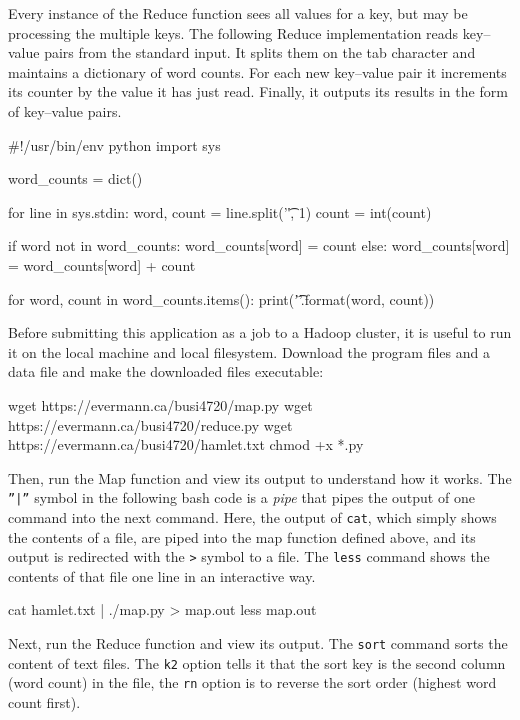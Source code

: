 Every instance of the Reduce function sees all values for a key, but may be processing the multiple keys. The following Reduce implementation reads key--value pairs from the standard input. It splits them on the tab character and maintains a dictionary of word counts. For each new key--value pair it increments its counter by the value it has just read. Finally, it outputs its results in the form of key--value pairs.

\begin{pythoncode}
#!/usr/bin/env python
import sys

word_counts = dict()

for line in sys.stdin:
    word, count = line.split('\t', 1)
    count = int(count)

    if word not in word_counts:
       word_counts[word] = count
    else:
      word_counts[word] = word_counts[word] + count

for word, count in word_counts.items():
    print('{}\t{}'.format(word, count))
\end{pythoncode}

Before submitting this application as a job to a Hadoop cluster, it is useful to run it on the local machine and local filesystem. Download the program files and a data file and make the downloaded files executable:

\begin{bashcode}
wget https://evermann.ca/busi4720/map.py
wget https://evermann.ca/busi4720/reduce.py
wget https://evermann.ca/busi4720/hamlet.txt
chmod +x *.py
\end{bashcode}

Then, run the Map function and view its output to understand how it works. The \texttt{''|''} symbol in the following bash code is a \emph{pipe} that pipes the output of one command into the next command. Here, the output of \texttt{cat}, which simply shows the contents of a file, are piped into the map function defined above, and its output is redirected with the \texttt{>} symbol to a file. The \texttt{less} command shows the contents of that file one line in an interactive way.

\begin{bashcode}
cat hamlet.txt | ./map.py > map.out
less map.out
\end{bashcode}

Next, run the Reduce function and view its output. The \texttt{sort} command sorts the content of text files. The \texttt{k2} option tells it that the sort key is the second column (word count) in the file, the \texttt{rn} option is to reverse the sort order (highest word count first).

